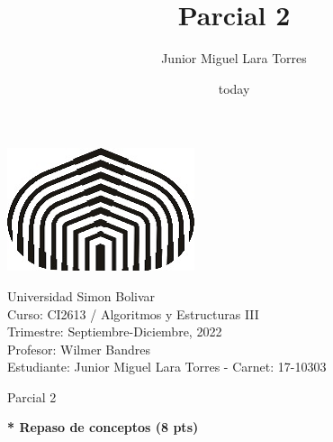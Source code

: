 \documentclass[a4paper,12pt]{article}
\title{Parcial 2}
\author{Junior Miguel Lara Torres}
\date{today}
\begin{document}
\begin{center}
\par \includegraphics[scale=1]{USB} \par
Universidad Simon Bolivar \\ Curso: CI2613 / Algoritmos y Estructuras III \\ Trimestre: Septiembre-Diciembre, 2022 \\ Profesor: Wilmer Bandres \\ Estudiante: Junior Miguel Lara Torres - Carnet: 17-10303 \\
\end{center}

\begin{center}
Parcial 2
\end{center}

\textbf{ * Repaso de conceptos (8 pts)}
\end{document}
